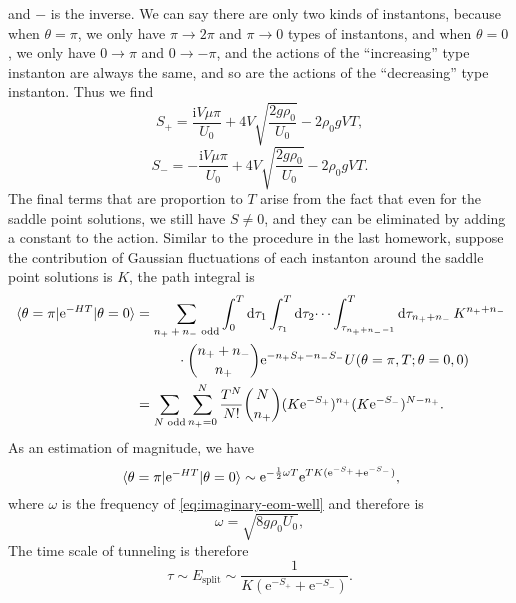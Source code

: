 \documentclass[hyperref, a4paper]{article}
\newcommand*{\ii}{\mathrm{i}}
\newcommand*{\ee}{\mathrm{e}}
\begin{document}
\begin{itemize}
and $-$ is the inverse.
We can say there are only two kinds of instantons,
because when $\theta = \pi$,
we only have $\pi \to 2\pi$ and $\pi \to 0$ types of instantons,
and when $\theta = 0$,
we only have $0 \to \pi$ and $0 \to - \pi$,
and the actions of the ``increasing'' type instanton are always the same,
and so are the actions of the ``decreasing'' type instanton.
Thus we find 
\begin{equation}
    S_+ = \frac{\ii V \mu \pi}{U_0} + 4 V \sqrt{\frac{2 g \rho_0}{U_0}} - 2 \rho_0 g V T,
\end{equation}
\begin{equation}
    S_- = - \frac{\ii V \mu \pi}{U_0} + 4 V \sqrt{\frac{2 g \rho_0}{U_0}} - 2 \rho_0 g V T.
\end{equation}
The final terms that are proportion to $T$
arise from the fact that even for the saddle point solutions,
we still have $S \neq 0$,
and they can be eliminated by adding a constant to the action.
Similar to the procedure in the last homework,
suppose the contribution of Gaussian fluctuations of each instanton around the saddle point solutions is $K$,
the path integral is 
\begin{equation}
    \begin{aligned}
        \mel{\theta = \pi}{\ee^{- H T}}{\theta = 0} &= \sum_{\text{$n_+ + n_-$ odd}}
        \int_0^{T} \dd{\tau_1} \int_{\tau_1}^{T} \dd{\tau_2} \dots \int_{\tau_{n_+ + n_- - 1}}^T 
        \dd{\tau_{n_+ + n_-}} K^{n_+ + n_-}  \\
        &\quad \quad \quad \cdot \binom{n_+ + n_-}{n_+} \ee^{- n_+ S_+ - n_- S_-} U(\theta = \pi, T; \theta = 0, 0) \\
        &= \sum_{\text{$N$ odd}} \sum_{n_+ = 0}^N \frac{T^N}{N!} 
        \binom{N}{n_+} (K \ee^{- S_+})^{n_+} (K \ee^{- S_-})^{N - n_+}.
    \end{aligned}
\end{equation}
As an estimation of magnitude,
we have 
\begin{equation}
    \mel{\theta = \pi}{\ee^{- H T}}{\theta = 0} 
    \sim \ee^{- \frac{1}{2} \omega T} \ee^{TK(\ee^{- S_+} + \ee^{- S_-})},
\end{equation}
where $\omega$ is the frequency of \eqref{eq:imaginary-eom-well} and therefore is 
\begin{equation}
    \omega = \sqrt{ 8 g \rho_0 U_0 },
\end{equation}
The time scale of tunneling is therefore 
\begin{equation}
    \tau \sim E_{\text{split}} \sim \frac{1}{K(\ee^{- S_+} + \ee^{- S_-})}. 
\end{equation}

\end{itemize}
\end{document}
